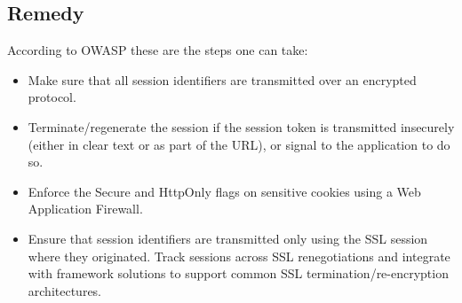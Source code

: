 \subsection{Remedy}

According to OWASP\cite{OWASPCookie} these are the steps one can take:
\begin{itemize}
    \item Make sure that all session identifiers are transmitted over an encrypted protocol.
    \item Terminate/regenerate the session if the session token is transmitted insecurely (either in clear text or as part of the URL), or signal to the application to do so.
    \item Enforce the Secure and HttpOnly flags on sensitive cookies using a Web Application Firewall.
    \item Ensure that session identifiers are transmitted only using the SSL session where they originated. Track sessions across SSL renegotiations and integrate with framework solutions to support common SSL termination/re-encryption architectures.
\end{itemize}